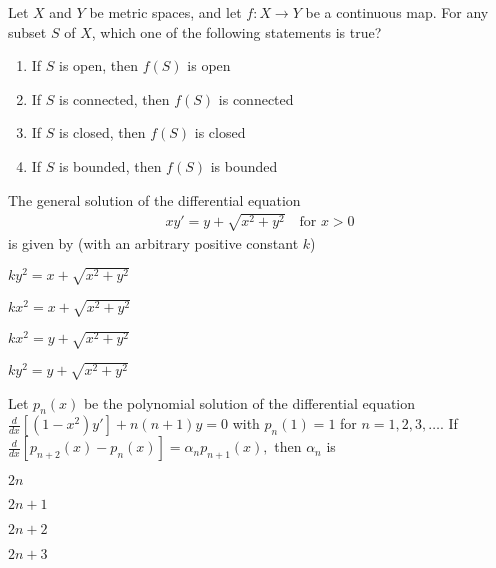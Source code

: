 \iffalse
    \title{Assignment}
    \author{EE24BTECH11063}
    \section{ma}
    \chapter{2018}
  \fi

\item Let $ X $ and $ Y $ be metric spaces, and let $ f : X \to Y $ be a continuous map. For any subset $ S $ of $ X $, which one of the following statements is true? 
\begin{enumerate}
    \item If $ S $ is open, then $ f(S) $ is open
    \item If $ S $ is connected, then $ f(S) $ is connected
    \item If $ S $ is closed, then $ f(S) $ is closed
    \item If $ S $ is bounded, then $ f(S) $ is bounded
\end{enumerate}

\bigskip

\item The general solution of the differential equation  
\begin{align*}
    xy' = y + \sqrt{x^2 + y^2} \quad \text{for } x > 0
\end{align*}
is given by (with an arbitrary positive constant $ k $)
\begin{enumerate}
\begin{multicols}{2}
    \item $ ky^2 = x + \sqrt{x^2 + y^2} $
    \columnbreak
    \item $ kx^2 = x + \sqrt{x^2 + y^2} $
    \end{multicols}
    \begin{multicols}{2}
    \item $ kx^2 = y + \sqrt{x^2 + y^2} $
    \item $ ky^2 = y + \sqrt{x^2 + y^2} $
    \end{multicols}
\end{enumerate}
\bigskip
\item  Let $ p_n(x) $ be the polynomial solution of the differential equation
$
\frac{d}{dx}\left[(1 - x^2)y'\right] + n(n + 1)y = 0
$
with $ p_n(1) = 1 $ for $ n = 1, 2, 3, \ldots $. If 
$
\frac{d}{dx}[p_{n + 2}(x) - p_n(x)] = \alpha_n p_{n + 1}(x),
$
then $ \alpha_n $ is 
\begin{enumerate}
\begin{multicols}{4}
    \item $ 2n $ 
    \item $ 2n + 1 $ 
    \item $ 2n + 2 $ 
    \item $ 2n + 3 $ 
    \end{multicols}
\end{enumerate}
\bigskip


